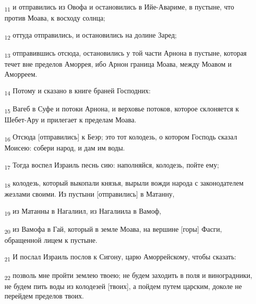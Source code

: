 \begin{tcolorbox}
\textsubscript{11} и отправились из Овофа и остановились в Ийе-Авариме, в пустыне, что против Моава, к восходу солнца;
\end{tcolorbox}
\begin{tcolorbox}
\textsubscript{12} оттуда отправились, и остановились на долине Заред;
\end{tcolorbox}
\begin{tcolorbox}
\textsubscript{13} отправившись отсюда, остановились у той части Арнона в пустыне, которая течет вне пределов Аморрея, ибо Арнон граница Моава, между Моавом и Аморреем.
\end{tcolorbox}
\begin{tcolorbox}
\textsubscript{14} Потому и сказано в книге браней Господних:
\end{tcolorbox}
\begin{tcolorbox}
\textsubscript{15} Вагеб в Суфе и потоки Арнона, и верховье потоков, которое склоняется к Шебет-Ару и прилегает к пределам Моава.
\end{tcolorbox}
\begin{tcolorbox}
\textsubscript{16} Отсюда [отправились] к Беэр; это тот колодезь, о котором Господь сказал Моисею: собери народ, и дам им воды.
\end{tcolorbox}
\begin{tcolorbox}
\textsubscript{17} Тогда воспел Израиль песнь сию: наполняйся, колодезь, пойте ему;
\end{tcolorbox}
\begin{tcolorbox}
\textsubscript{18} колодезь, который выкопали князья, вырыли вожди народа с законодателем жезлами своими. Из пустыни [отправились] в Матанну,
\end{tcolorbox}
\begin{tcolorbox}
\textsubscript{19} из Матанны в Нагалиил, из Нагалиила в Вамоф,
\end{tcolorbox}
\begin{tcolorbox}
\textsubscript{20} из Вамофа в Гай, который в земле Моава, на вершине [горы] Фасги, обращенной лицем к пустыне.
\end{tcolorbox}
\begin{tcolorbox}
\textsubscript{21} И послал Израиль послов к Сигону, царю Аморрейскому, чтобы сказать:
\end{tcolorbox}
\begin{tcolorbox}
\textsubscript{22} позволь мне пройти землею твоею; не будем заходить в поля и виноградники, не будем пить воды из колодезей [твоих], а пойдем путем царским, доколе не перейдем пределов твоих.
\end{tcolorbox}
